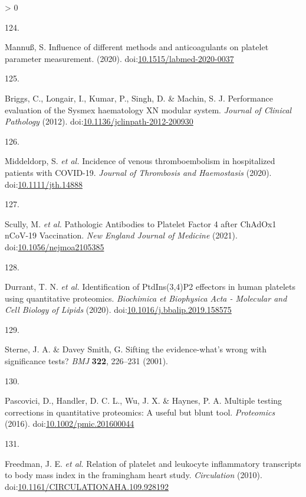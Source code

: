 \documentclass[11pt,twoside]{bristolthesis}
\newlength{\cslhangindent}
\newlength{\csllabelwidth}
\newenvironment{CSLReferences}[2] %
 {%
  \setlength{\parindent}{0pt}
  \ifodd #1 \everypar{\setlength{\hangindent}{\cslhangindent}}\ignorespaces\fi
  \ifnum #2 > 0
  \setlength{\parskip}{#2\baselineskip}
  \fi
 }%
 {}
\newcommand{\CSLLeftMargin}[1]{\parbox[t]{\csllabelwidth}{#1}}
\newcommand{\CSLRightInline}[1]{\parbox[t]{\linewidth - \csllabelwidth}{#1}\break}
\begin{document}
\begin{CSLReferences}{0}{0}
\leavevmode\hypertarget{ref-Mannuuxdf2020}{}%
\CSLLeftMargin{124. }
\CSLRightInline{Mannuß, S. {Influence of different methods and anticoagulants on platelet parameter measurement}. (2020). doi:\href{https://doi.org/10.1515/labmed-2020-0037}{10.1515/labmed-2020-0037}}

\leavevmode\hypertarget{ref-Briggs2012}{}%
\CSLLeftMargin{125. }
\CSLRightInline{Briggs, C., Longair, I., Kumar, P., Singh, D. \& Machin, S. J. {Performance evaluation of the Sysmex haematology XN modular system}. \emph{Journal of Clinical Pathology} (2012). doi:\href{https://doi.org/10.1136/jclinpath-2012-200930}{10.1136/jclinpath-2012-200930}}

\leavevmode\hypertarget{ref-Middeldorp2020}{}%
\CSLLeftMargin{126. }
\CSLRightInline{Middeldorp, S. \emph{et al.} {Incidence of venous thromboembolism in hospitalized patients with COVID-19}. \emph{Journal of Thrombosis and Haemostasis} (2020). doi:\href{https://doi.org/10.1111/jth.14888}{10.1111/jth.14888}}

\leavevmode\hypertarget{ref-Scully2021}{}%
\CSLLeftMargin{127. }
\CSLRightInline{Scully, M. \emph{et al.} {Pathologic Antibodies to Platelet Factor 4 after ChAdOx1 nCoV-19 Vaccination}. \emph{New England Journal of Medicine} (2021). doi:\href{https://doi.org/10.1056/nejmoa2105385}{10.1056/nejmoa2105385}}

\leavevmode\hypertarget{ref-Durrant2020}{}%
\CSLLeftMargin{128. }
\CSLRightInline{Durrant, T. N. \emph{et al.} {Identification of PtdIns(3,4)P2 effectors in human platelets using quantitative proteomics}. \emph{Biochimica et Biophysica Acta - Molecular and Cell Biology of Lipids} (2020). doi:\href{https://doi.org/10.1016/j.bbalip.2019.158575}{10.1016/j.bbalip.2019.158575}}

\leavevmode\hypertarget{ref-Sterne2001}{}%
\CSLLeftMargin{129. }
\CSLRightInline{Sterne, J. A. \& Davey Smith, G. {Sifting the evidence-what's wrong with significance tests?} \emph{BMJ} \textbf{322}, 226--231 (2001).}

\leavevmode\hypertarget{ref-Pascovici2016}{}%
\CSLLeftMargin{130. }
\CSLRightInline{Pascovici, D., Handler, D. C. L., Wu, J. X. \& Haynes, P. A. {Multiple testing corrections in quantitative proteomics: A useful but blunt tool}. \emph{Proteomics} (2016). doi:\href{https://doi.org/10.1002/pmic.201600044}{10.1002/pmic.201600044}}

\leavevmode\hypertarget{ref-Freedman2010}{}%
\CSLLeftMargin{131. }
\CSLRightInline{Freedman, J. E. \emph{et al.} {Relation of platelet and leukocyte inflammatory transcripts to body mass index in the framingham heart study}. \emph{Circulation} (2010). doi:\href{https://doi.org/10.1161/CIRCULATIONAHA.109.928192}{10.1161/CIRCULATIONAHA.109.928192}}


\end{CSLReferences}
\end{document}
